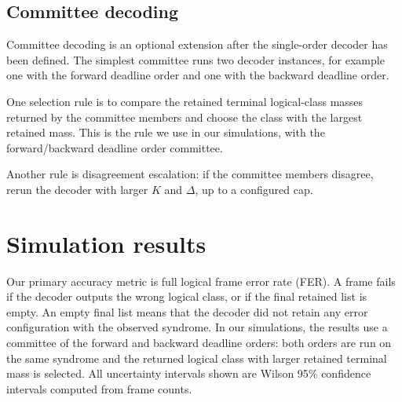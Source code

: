 \documentclass[a4paper,twocolumn,11pt,unpublished]{quantumarticle}
\begin{document}
\begin{figure}[htp]
\begin{center}
\end{center}
\end{figure}





\subsection{Committee decoding}

Committee decoding is an optional extension after the single-order decoder has
been defined. The simplest committee runs two decoder instances, for example one
with the forward deadline order and one with the backward deadline order.

One selection rule is to compare the retained terminal logical-class masses
returned by the committee members and choose the class with the largest retained
mass. This is the rule we use in our simulations, with the forward/backward deadline order committee.

Another rule is disagreement escalation: if the committee members disagree,
rerun the decoder with larger \(K\) and \(\Delta\), up to a configured cap.


\section{Simulation results}
\label{sec:results}

Our primary accuracy metric is full logical frame error rate (FER). A frame
fails if the decoder outputs the wrong logical class, or if the final retained
list is empty. An empty final list means that the decoder did not retain any
error configuration with the observed syndrome. In our simulations, the
results use a committee of the forward and backward deadline orders: both orders are run on the same syndrome and the returned logical class with larger retained
terminal mass is selected.
All uncertainty intervals shown are Wilson 95\% confidence intervals computed
from frame counts. 
\end{document}

